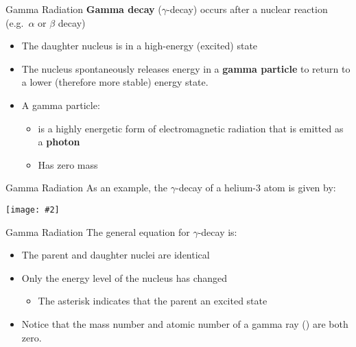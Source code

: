 \documentclass[12pt,compress,aspectratio=169]{beamer}
\newcommand{\pic}[2]{\texttt{[image: \#2]}}
\newcommand{\eq}[2]{
  \vspace{#1}{\Large\begin{displaymath}#2\end{displaymath}}
}
\begin{document}
\begin{frame}{Gamma Radiation}
  \textbf{Gamma decay} ($\gamma$-decay) occurs after a nuclear reaction
  (e.g.\ $\alpha$ or $\beta$ decay)
  \begin{itemize}
  \item The daughter nucleus is in a high-energy (excited) state
  \item The nucleus spontaneously releases energy in a \textbf{gamma particle}
    to return to a lower (therefore more stable) energy state.
  \item A gamma particle:
    \begin{itemize}
    \item is a highly energetic form of electromagnetic radiation that is
      emitted as a \textbf{photon}
    \item Has zero mass
    \end{itemize}
  \end{itemize}
\end{frame}


\begin{frame}{Gamma Radiation}
  As an example, the $\gamma$-decay of a helium-3 atom is given by:
  \begin{center}
    \pic{.65}{graphics/gamma-decay}
  \end{center}

  \eq{-.25in}{
    \boxed{\ce{^3_2He^* -> ^3_2He + ^0_0$\gamma$}}
  }
\end{frame}



\begin{frame}{Gamma Radiation}
  The general equation for $\gamma$-decay is:

  \eq{-.15in}{
    \boxed{\ce{^A_ZX^* -> ^A_ZX + ^0_0$\gamma$}}
  }
  \begin{itemize}
  \item The parent and daughter nuclei are identical
  \item Only the energy level of the nucleus has changed
    \begin{itemize}
    \item The asterisk indicates that the parent an excited state
    \end{itemize}
  \item Notice that the mass number and atomic number of a gamma ray
    () are both zero.
  \end{itemize}
\end{frame}
\end{document}
